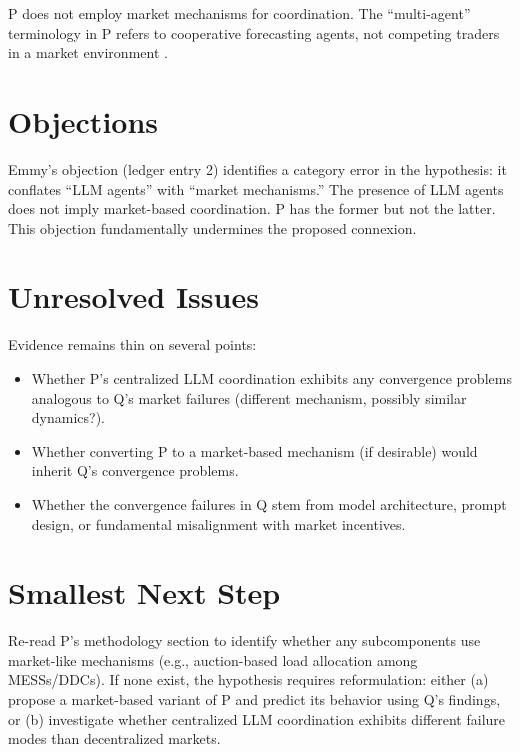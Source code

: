 \documentclass{article}
\begin{document}
P does not employ market mechanisms for coordination. The ``multi-agent'' terminology in P refers to cooperative forecasting agents, not competing traders in a market environment .

\section{Objections}

Emmy's objection (ledger entry 2) identifies a category error in the hypothesis: it conflates ``LLM agents'' with ``market mechanisms.'' The presence of LLM agents does not imply market-based coordination. P has the former but not the latter. This objection fundamentally undermines the proposed connexion.

\section{Unresolved Issues}

Evidence remains thin on several points:

\begin{itemize}
  \item Whether P's centralized LLM coordination exhibits any convergence problems analogous to Q's market failures (different mechanism, possibly similar dynamics?).
  \item Whether converting P to a market-based mechanism (if desirable) would inherit Q's convergence problems.
  \item Whether the convergence failures in Q stem from model architecture, prompt design, or fundamental misalignment with market incentives.
\end{itemize}

\section{Smallest Next Step}

Re-read P's methodology section to identify whether any subcomponents use market-like mechanisms (e.g., auction-based load allocation among MESSs/DDCs). If none exist, the hypothesis requires reformulation: either (a) propose a market-based variant of P and predict its behavior using Q's findings, or (b) investigate whether centralized LLM coordination exhibits different failure modes than decentralized markets.
\end{document}

